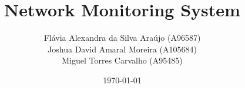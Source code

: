 



\title{\LARGE{Network Monitoring System}}

\author{
    Flávia Alexandra da Silva Araújo (A96587)\\ \quad
    Joshua David Amaral Moreira (A105684)\\ \quad
    Miguel Torres Carvalho (A95485)\\ \quad
}

\date{\today}

\newcommand{\Course}{Licenciatura em Engenharia Informática}

\newcommand{\Department}{Escola de Engenharia}

\newcommand{\UniName}{Universidade do Minho}

\newcommand{\UniPic}{\texttt{[image: img/eeum.png]}}

\newcommand{\University}{
    \begin{flushleft}
        \UniPic
    \end{flushleft}
    \textcolor{gray}{\small\textbf{\textsf{\UniName}}}\par
    \textcolor{gray!80!white}{\small{\textsf{\Department}}}\par
    \textcolor{gray!70!white}{\small{\textsf{\Course}}}
}

\newcommand{\UC}{
    \begin{flushleft}
        \par\textcolor{titlepagecolor}{\Large\textbf{\textsf{Comunicações por Computador}}}
    \end{flushleft}
}

